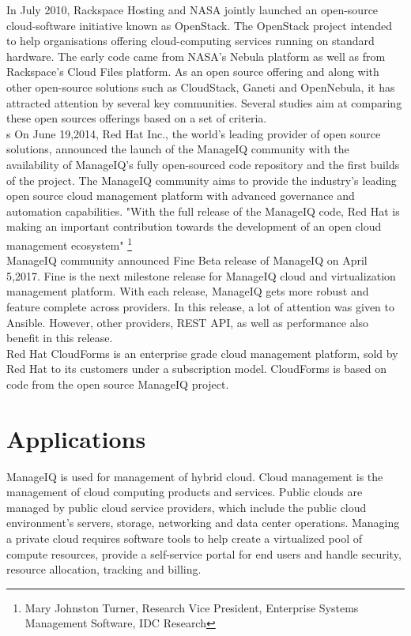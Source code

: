 \documentclass[a4paper,12pt]{report}
\begin{document}
In July 2010, Rackspace Hosting and NASA jointly launched an open-source cloud-software initiative known as OpenStack. The OpenStack project intended to help organisations offering cloud-computing services running on standard hardware. The early code came from NASA's Nebula platform as well as from Rackspace's Cloud Files platform. As an open source offering and along with other open-source solutions such as CloudStack, Ganeti and OpenNebula, it has attracted attention by several key communities. Several studies aim at comparing these open sources offerings based on a set of criteria.\\
s
On June 19,2014, Red Hat Inc., the world’s leading provider of open source solutions, announced the launch of the ManageIQ community with the availability of ManageIQ’s fully open-sourced code repository and the first builds of the project. The ManageIQ community aims to provide the industry's leading open source cloud management platform with advanced governance and automation capabilities.
"With the full release of the ManageIQ code, Red Hat is making an important contribution towards the development of an open cloud management ecosystem"
\footnote{Mary Johnston Turner, Research Vice President, Enterprise Systems Management Software, IDC Research}\\

ManageIQ community announced Fine Beta release of ManageIQ on April 5,2017. Fine is the next milestone release for ManageIQ cloud and virtualization management platform. With each release, ManageIQ gets more robust and feature complete across providers. In this release, a lot of attention was given to Ansible. However, other providers, REST API, as well as performance also benefit in this release.\\

Red Hat CloudForms is an enterprise grade cloud management platform, sold by Red Hat to its customers under a subscription model. CloudForms is based on code from the open source ManageIQ project.

\chapter{Applications}
ManageIQ is used for management of hybrid cloud. Cloud management is the management of cloud computing products and services. Public clouds are managed by public cloud service providers, which include the public cloud environment’s servers, storage, networking and data center operations. Managing a private cloud requires software tools to help create a virtualized pool of compute resources, provide a self-service portal for end users and handle security, resource allocation, tracking and billing.\\
\end{document}
